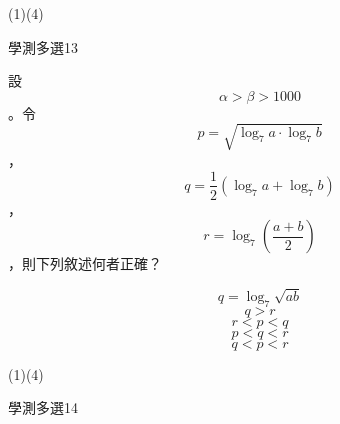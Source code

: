 \begin{QUESTIONS}
\begin{QUESTION}
\begin{QBODY}
        \end{QBODY}
        \begin{QFROMS}
        \end{QFROMS}
        \begin{QTAGS}\end{QTAGS}
        \begin{QANS}
            (1)(4)
        \end{QANS}
        \begin{QSOLLIST}
        \end{QSOLLIST}
        \begin{QEMPTYSPACE}
        \end{QEMPTYSPACE}
    \end{QUESTION}
    \begin{QUESTION}
        \begin{ExamInfo}{85}{學測}{多選}{13}
        \end{ExamInfo}
        \begin{ExamAnsRateInfo}{}{}{}{}
        \end{ExamAnsRateInfo}
        \begin{QBODY}
            	設\[\alpha >\beta >1000\]。令\[p=\sqrt{{{\log }_{7}}a\cdot {{\log }_{7}}b}\]，\[q=\frac{1}{2}\left( {{\log }_{7}}a+{{\log }_{7}}b \right)\]，\[r={{\log }_{7}}\left( \frac{a+b}{2} \right)\]，則下列敘述何者正確？
            \begin{QOPS} 
 \QOP\[q={{\log }_{7}}\sqrt{ab}\]
            \QOP\[q>r\]
            \QOP\[r<p<q\]
            \QOP\[p<q<r\]
            \QOP\[q<p<r\]
            \end{QOPS}            
        \end{QBODY}
        \begin{QFROMS}
        \end{QFROMS}
        \begin{QTAGS}\end{QTAGS}
        \begin{QANS}
            (1)(4)
        \end{QANS}
        \begin{QSOLLIST}
        \end{QSOLLIST}
        \begin{QEMPTYSPACE}
        \end{QEMPTYSPACE}
    \end{QUESTION}
    \begin{QUESTION}
        \begin{ExamInfo}{85}{學測}{多選}{14}

\end{ExamInfo}
\end{QUESTION}
\end{QUESTIONS}
